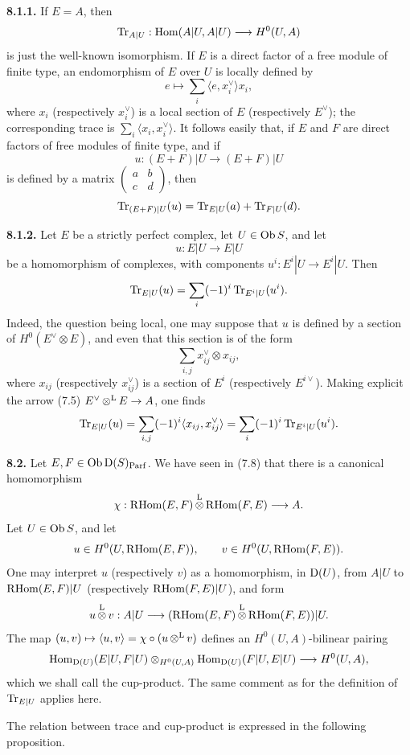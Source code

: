 \documentclass[11pt]{article}
\newcommand{\Parf}{\operatorname{Parf}}
\begin{document}
\textbf{8.1.1.} If \(E=A\), then
\[
  \operatorname{Tr}_{A|U}:\operatorname{Hom}(A|U,A|U)\longrightarrow H^0(U,A)
\]
is just the well-known isomorphism. If \(E\) is a direct factor of a free module of finite type, an endomorphism of \(E\) over \(U\) is locally defined by
\[
  e\longmapsto \sum_i\langle e,x_i^\vee\rangle x_i,
\]
where \(x_i\) (respectively \(x_i^\vee\)) is a local section of \(E\) (respectively \(E^\vee\)); the corresponding trace is \(\sum_i\langle x_i,x_i^\vee\rangle\). It follows easily that, if \(E\) and \(F\) are direct factors of free modules of finite type, and if
\[
  u:(E+F)|U\longrightarrow(E+F)|U
\]
is defined by a matrix \(\begin{pmatrix}a&b\\ c&d\end{pmatrix}\), then
\[
  \operatorname{Tr}_{(E+F)|U}(u)=\operatorname{Tr}_{E|U}(a)+\operatorname{Tr}_{F|U}(d).
\]

\textbf{8.1.2.} Let \(E\) be a strictly perfect complex, let \(U\in\operatorname{Ob} S\), and let
\[
  u:E|U\longrightarrow E|U
\]
be a homomorphism of complexes, with components \(u^i:E^i|U\to E^i|U\). Then
\[
  \operatorname{Tr}_{E|U}(u)=\sum_i(-1)^i\operatorname{Tr}_{E^i|U}(u^i).
\]
Indeed, the question being local, one may suppose that \(u\) is defined by a section of \(H^0(E^\vee\otimes E)\), and even that this section is of the form
\[
  \sum_{i,j}x_{ij}^\vee\otimes x_{ij},
\]
where \(x_{ij}\) (respectively \(x_{ij}^\vee\)) is a section of \(E^i\) (respectively \(E^{i\vee}\)). Making explicit the arrow (7.5) \(E^\vee\mathop{\otimes}^{\mathrm L} E\to A\), one finds
\[
  \operatorname{Tr}_{E|U}(u)=\sum_{i,j}(-1)^i\langle x_{ij},x_{ij}^\vee\rangle
  =\sum_i(-1)^i\operatorname{Tr}_{E^i|U}(u^i).
\]

\textbf{8.2.} Let \(E,F\in\Ob\Dpx(S)_{\Parf}\). We have seen in (7.8) that there is a canonical homomorphism
\[
  \chi:\mathrm R\!\operatorname{Hom}(E,F)\mathop{\otimes}^{\mathrm L}\mathrm R\!\operatorname{Hom}(F,E)\longrightarrow A.
\]
Let \(U\in\operatorname{Ob} S\), and let
\[
  u\in H^0(U,\mathrm R\!\operatorname{Hom}(E,F)),\qquad v\in H^0(U,\mathrm R\!\operatorname{Hom}(F,E)).
\]
One may interpret \(u\) (respectively \(v\)) as a homomorphism, in \(\mathrm D(U)\), from \(A|U\) to \(\mathrm R\!\operatorname{Hom}(E,F)|U\) (respectively \(\mathrm R\!\operatorname{Hom}(F,E)|U\)), and form
\[
  u\mathop{\otimes}^{\mathrm L} v:A|U\longrightarrow(\mathrm R\!\operatorname{Hom}(E,F)\mathop{\otimes}^{\mathrm L}\mathrm R\!\operatorname{Hom}(F,E))|U.
\]
The map \((u,v)\mapsto\langle u,v\rangle=\chi\circ(u\mathop{\otimes}^{\mathrm L} v)\) defines an \(H^0(U,A)\)-bilinear pairing
\[
  \operatorname{Hom}_{\mathrm D(U)}(E|U,F|U)\otimes_{H^0(U,A)}\operatorname{Hom}_{\mathrm D(U)}(F|U,E|U)
  \longrightarrow H^0(U,A),
\]
which we shall call the cup-product. The same comment as for the definition of \(\operatorname{Tr}_{E|U}\) applies here.

The relation between trace and cup-product is expressed in the following proposition.
\end{document}
